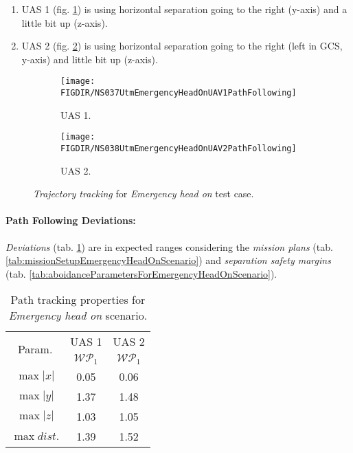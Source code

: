 \begin{enumerate}
    \item UAS 1 (fig. \ref{fig:emergencyHeadOnUAS1PathTracking}) is using horizontal separation going to the right (y-axis) and a little bit up (z-axis).
    
    \item UAS 2 (fig. \ref{fig:emergencyHeadOnUAS2PathTracking}) is using horizontal separation going to the right (left in GCS, y-axis) and little bit up (z-axis).
\end{enumerate}

\begin{figure}[H]
	\centering
    \begin{subfigure}{0.48\textwidth}
    	\centering
        \texttt{[image: \\FIGDIR/NS037UtmEmergencyHeadOnUAV1PathFollowing]}
        \caption{UAS 1.}
        \label{fig:emergencyHeadOnUAS1PathTracking}
    \end{subfigure}
    \begin{subfigure}{0.48\textwidth}
    	\centering
        \texttt{[image: \\FIGDIR/NS038UtmEmergencyHeadOnUAV2PathFollowing]} 
        \caption{UAS 2.}
        \label{fig:emergencyHeadOnUAS2PathTracking}
    \end{subfigure}
    \caption{\emph{Trajectory tracking} for \emph{Emergency head on} test case. }
    \label{fig:emergencyHeadOnTrajectoryTrackingPerformance}
\end{figure}


\paragraph{Path Following Deviations:} \emph{Deviations} (tab. \ref{tab:pathTrackingParametersForEmergencyHeadOn}) are in expected ranges considering the \emph{mission plans} (tab. \ref{tab:missionSetupEmergencyHeadOnScenario}) and \emph{separation safety margins} (tab. \ref{tab:aboidanceParametersForEmergencyHeadOnScenario}).


\begin{table}[H]
    \centering
    \begin{tabular}{c||c|c}
        \multirow{2}{*}{Param.} & UAS 1     & UAS 2\\\cline{2-3}
                        & $\mathscr{WP}_1$  & $\mathscr{WP}_1$\\\hline\hline
          $\max |x|$    & 0.05              & 0.06 \\\hline
          $\max |y|$    & 1.37              & 1.48 \\\hline
          $\max |z|$    & 1.03              & 1.05 \\\hline
          $\max dist.$  & 1.39              & 1.52 \\
    \end{tabular}
    \caption{Path tracking properties for \emph{Emergency head on} scenario.}
    \label{tab:pathTrackingParametersForEmergencyHeadOn}
\end{table}